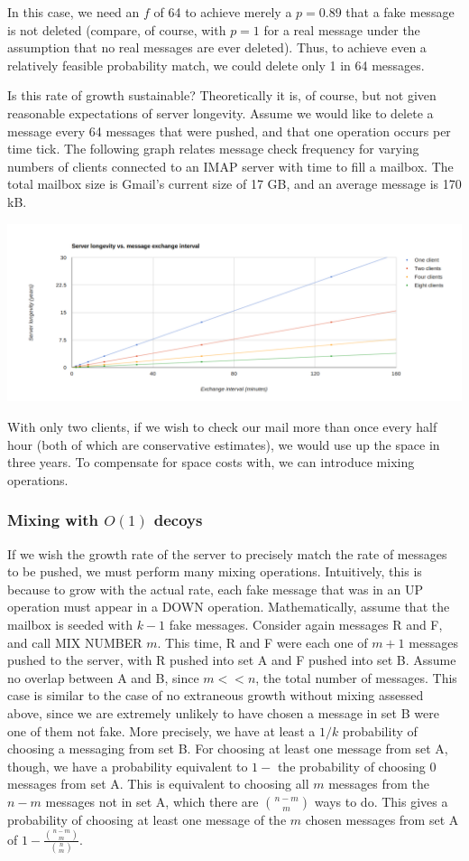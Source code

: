 \documentclass[pageno]{jpaper}
\begin{document}
In this case, we need an $f$ of 64 to achieve merely a $p=0.89$ that a fake message is not deleted (compare, of course, with $p=1$ for a real message under the assumption that no real messages are ever deleted). Thus, to achieve even a relatively feasible probability match, we could delete only 1 in 64 messages.

Is this rate of growth sustainable? Theoretically it is, of course, but not given reasonable expectations of server longevity. Assume we would like to delete a message every 64 messages that were pushed, and that one operation occurs per time tick. The following graph relates message check frequency for varying numbers of clients connected to an IMAP server with time to fill a mailbox. The total mailbox size is Gmail's current size of 17 GB, and an average message is 170 kB.

\includegraphics[width=\textwidth]{server_longevity}

With only two clients, if we wish to check our mail more than once every half hour (both of which are conservative estimates), we would use up the space in three years. To compensate for space costs with, we can introduce mixing operations.

\subsubsection{Mixing with \texorpdfstring{$O(1)$}{O(1)} decoys}

If we wish the growth rate of the server to precisely match the rate of messages to be pushed, we must perform many mixing operations. Intuitively, this is because to grow with the actual rate, each fake message that was in an UP operation must appear in a DOWN operation. Mathematically, assume that the mailbox is seeded with $k-1$ fake messages. Consider again messages R and F, and call MIX NUMBER $m$. This time, R and F were each one of $m + 1$ messages pushed to the server, with R pushed into set A and F pushed into set B. Assume no overlap between A and B, since $m<<n$, the total number of messages. This case is similar to the case of no extraneous growth without mixing assessed above, since we are extremely unlikely to have chosen a message in set B were one of them not fake. More precisely, we have at least a $1/k$ probability of choosing a messaging from set B. For choosing at least one message from set A, though, we have a probability equivalent to $1-$ the probability of choosing 0 messages from set A. This is equivalent to choosing all $m$ messages from the $n-m$ messages not in set A, which there are ${{n-m}\choose m}$ ways to do. This gives a probability of choosing at least one message of the $m$ chosen messages from set A of $1-\frac{{{n-m}\choose m}}{{n \choose m}}$.
\end{document}
